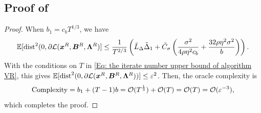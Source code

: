 \subsection{Proof of }
\label{Subsubsec: proof theorem STORM}
\begin{proof}
    When $b_{1}= c_{b}T^{1/3}$, we have
    \[
        \mathbb{E}[\text{dist}^{2}(0, \partial \mathcal{L}(\bm{x}^{R}, \bm{B}^{R}, \bm{\Lambda}^{R})
        ] \leq \frac{1}{T^{2/3}}\left(\tilde{L}_{\Delta}\tilde{\Delta}_{1}+ \tilde{C}_{\sigma}
        \left( \frac{\sigma^{2}}{ 4\rho \eta^{2}c_{b}}+ \frac{32\rho\eta^{2}\sigma^{2}}{b}
        \right) \right).
    \]
    With the conditions on $T$ in \eqref{Eq: the iterate number upper bound of algorithm VR},
    this gives
    $\mathbb{E}[\text{dist}^{2}(0, \partial \mathcal{L}(\bm{x}^{R}, \bm{B}^{R}, \bm{\Lambda}^{R}))]
    \leq \varepsilon^{2}$. Then, the oracle complexity is
    \[
        \text{Complexity}= b_{1}+ (T-1)b = \mathcal{O}(T^{\frac{1}{3}}) + \mathcal{O}(T) = \mathcal{O}
        (T) = \mathcal{O}(\varepsilon^{-3}),
    \]
    which completes the proof. 
\end{proof}

